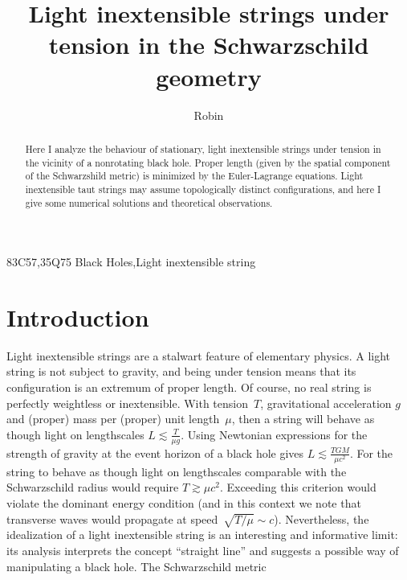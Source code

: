 \documentclass[times,twocolumn,final]{elsarticle}
\begin{document}

\begin{frontmatter}

\title{Light inextensible strings under tension in the Schwarzschild geometry}

\author[1]{Robin }

\address[1]{Auckland University of Technology, 2-14 Wakefield Street,
  Auckland 1142, New Zealand}




\begin{abstract}
Here I analyze the behaviour of stationary, light inextensible strings
under tension in the vicinity of a nonrotating black hole.  Proper
length (given by the spatial component of the Schwarzshild metric) is
minimized by the Euler-Lagrange equations.  Light inextensible taut
strings may assume topologically distinct configurations, and here I
give some numerical solutions and theoretical observations.  
\end{abstract}

\begin{keyword}
\MSC 83C57\sep 35Q75
\KWD Black Holes\sep Light inextensible string
\end{keyword}

\end{frontmatter}


\section{Introduction}
\label{intro}
Light inextensible strings are a stalwart feature of elementary
physics.  A light string is not subject to gravity, and being under
tension means that its configuration is an extremum of proper length.
Of course, no real string is perfectly weightless or inextensible.
With tension~$T$, gravitational acceleration $g$ and (proper) mass per
(proper) unit length~$\mu$, then a string will behave as though light
on lengthscales $L\lesssim\frac{T}{\mu g}$.  Using Newtonian
expressions for the strength of gravity at the event horizon of a
black hole gives $L\lesssim\frac{TGM}{\mu c^2}$.  For the string to
behave as though light on lengthscales comparable with the
Schwarzschild radius would require $T\gtrsim\mu c^2$.  Exceeding this
criterion would violate the dominant energy condition (and in this
context we note that transverse waves would propagate at
speed~$\sqrt{T/\mu}\sim c$).  Nevertheless, the idealization of a
light inextensible string is an interesting and informative limit: its
analysis interprets the concept ``straight line'' and suggests a
possible way of manipulating a black hole.  The Schwarzschild metric
\end{document}
